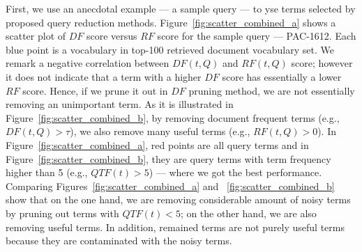 First, we use an anecdotal example --- a sample query --- to yse terms selected by proposed query reduction methods. 
Figure~\ref{fig:scatter_combined_a} shows a scatter plot of $\mathit{DF}$ score versus $\mathit{RF}$ score for the sample query --- PAC-1612. Each blue point is a vocabulary in top-100 retrieved document vocabulary set. We remark a negative correlation between $\mathit{DF(t, Q)}$ and $\mathit{RF(t, Q)}$ score; however it does not indicate that a term with a higher $\mathit{DF}$ score has essentially a lower $\mathit{RF}$ score.
Hence, if we prune it out in $\mathit{DF}$ pruning method, we are not essentially removing an unimportant term.
As it is illustrated in Figure~\ref{fig:scatter_combined_b}, by removing document frequent terms (e.g., $DF(t, Q)>\tau$), we also remove many useful terms (e.g., $RF(t, Q)>0$). In Figure~\ref{fig:scatter_combined_a}, red points are all query terms and in Figure~\ref{fig:scatter_combined_b}, they are query terms with term frequency higher than 5 (e.g., $QTF(t)>5$) --- where we got the best performance. 
Comparing Figures~\ref{fig:scatter_combined_a} and ~\ref{fig:scatter_combined_b} show that on the one hand, we are removing considerable amount of noisy terms by pruning out  terms with $QTF(t)<5$; on the other hand, we are also removing useful terms. In addition, remained terms are not purely useful terms because they are contaminated with the noisy terms. %

